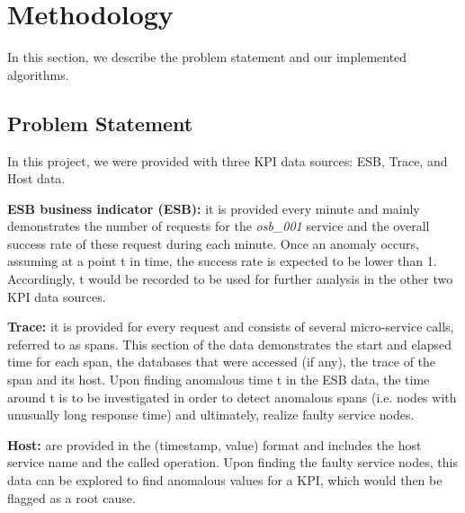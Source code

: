 \documentclass[12pt]{article}
\begin{document}
\section{Methodology} 
In this section, we describe the problem statement and our implemented algorithms.

\vspace{-0.2cm}
\subsection{Problem Statement}
In this project, we were provided with three KPI data sources: ESB, Trace, and Host data.

\smallskip\smallskip
\noindent \textbf{ESB business indicator (ESB): }it is provided every minute and mainly demonstrates the number of requests for the \textit{osb\_001} service and the overall success rate of these request during each minute. Once an anomaly occurs, assuming at a point t in time, the success rate is expected to be lower than 1. Accordingly, t would be recorded to be used for further analysis in the other two KPI data sources.

\smallskip
\noindent \textbf{Trace: }it is provided for every request and consists of several micro-service calls, referred to as spans. This section of the data demonstrates the start and elapsed time for each span, the databases that were accessed (if any), the trace of the span and its host. Upon finding anomalous time t in the ESB data, the time around t is to be investigated in order to detect anomalous spans (i.e. nodes with unusually long response time) and ultimately, realize faulty service nodes. 

\smallskip
\noindent \textbf{Host: }are provided in the (timestamp, value) format and includes the host service name and the called operation. Upon finding the faulty service nodes, this data can be explored to find anomalous values for a KPI, which would then be flagged as a root cause.

\vspace{-0.2cm}
\end{document}
